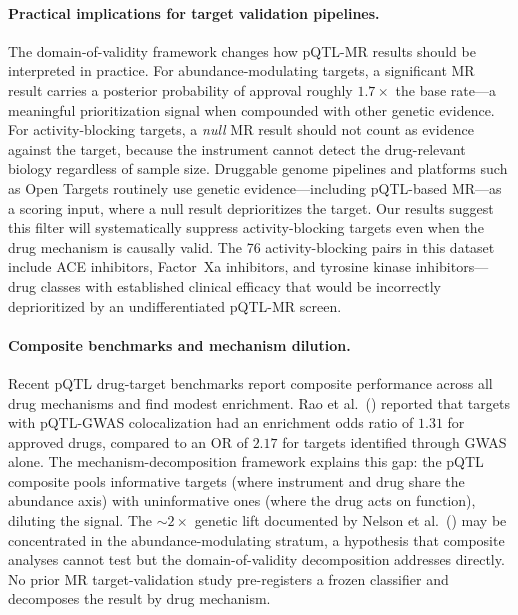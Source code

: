 \documentclass[11pt]{article}
\begin{document}
\paragraph{Practical implications for target validation pipelines.}
The domain-of-validity framework changes how pQTL-MR results should be interpreted in practice. For abundance-modulating targets, a significant MR result carries a posterior probability of approval roughly $1.7\times$ the base rate---a meaningful prioritization signal when compounded with other genetic evidence. For activity-blocking targets, a \emph{null} MR result should not count as evidence against the target, because the instrument cannot detect the drug-relevant biology regardless of sample size. Druggable genome pipelines \citep{finan2017druggable} and platforms such as Open Targets routinely use genetic evidence---including pQTL-based MR---as a scoring input, where a null result deprioritizes the target. Our results suggest this filter will systematically suppress activity-blocking targets even when the drug mechanism is causally valid. The 76 activity-blocking pairs in this dataset include ACE inhibitors, Factor~Xa inhibitors, and tyrosine kinase inhibitors---drug classes with established clinical efficacy that would be incorrectly deprioritized by an undifferentiated pQTL-MR screen.

\paragraph{Composite benchmarks and mechanism dilution.}
Recent pQTL drug-target benchmarks report composite performance across all drug mechanisms and find modest enrichment. Rao et al.\ (\citeyear{rao2023pqtl}) reported that targets with pQTL-GWAS colocalization had an enrichment odds ratio of $1.31$ for approved drugs, compared to an OR of $2.17$ for targets identified through GWAS alone. The mechanism-decomposition framework explains this gap: the pQTL composite pools informative targets (where instrument and drug share the abundance axis) with uninformative ones (where the drug acts on function), diluting the signal. The ${\sim}2\times$ genetic lift documented by Nelson et al.\ (\citeyear{nelson2015support}) may be concentrated in the abundance-modulating stratum, a hypothesis that composite analyses cannot test but the domain-of-validity decomposition addresses directly. No prior MR target-validation study pre-registers a frozen classifier and decomposes the result by drug mechanism.
\end{document}
